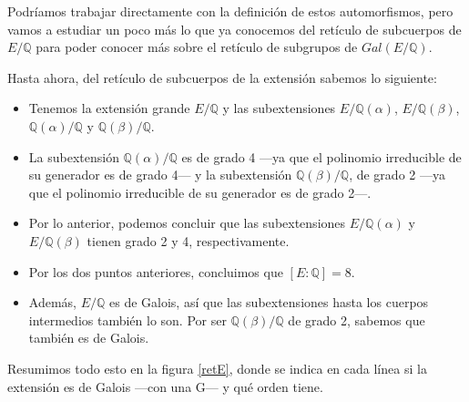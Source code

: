 \documentclass[a4paper, 11pt]{article}
\begin{document}
\begin{solucion}
      Podríamos trabajar directamente con la definición de estos automorfismos, pero vamos a estudiar un poco más lo que ya conocemos del retículo de subcuerpos de $E/\mathbb{Q}$ para poder conocer más sobre el retículo de subgrupos de $Gal(E/\mathbb{Q})$.

      Hasta ahora, del retículo de subcuerpos de la extensión sabemos lo siguiente:
      \begin{itemize}
          \item Tenemos la extensión grande $E/\mathbb{Q}$ y las subextensiones $E/\mathbb{Q}(\alpha)$, $E/\mathbb{Q}(\beta)$, $\mathbb{Q}(\alpha)/\mathbb{Q}$ y $\mathbb{Q}(\beta)/\mathbb{Q}$.
          \item La subextensión $\mathbb{Q}(\alpha)/\mathbb{Q}$ es de grado 4 ---ya que el polinomio irreducible de su generador es de grado 4--- y la subextensión $\mathbb{Q}(\beta)/\mathbb{Q}$, de grado 2 ---ya que el polinomio irreducible de su generador es de grado 2---.
          \item Por lo anterior, podemos concluir que las subextensiones $E/\mathbb{Q}(\alpha)$ y $E/\mathbb{Q}(\beta)$ tienen grado 2 y 4, respectivamente.
          \item Por los dos puntos anteriores, concluimos que $[E:\mathbb{Q}] = 8$.
          \item Además, $E/\mathbb{Q}$ es de Galois, así que las subextensiones hasta los cuerpos intermedios también lo son. Por ser $\mathbb{Q}(\beta)/\mathbb{Q}$ de grado 2, sabemos que también es de Galois.
      \end{itemize}

      Resumimos todo esto en la figura \ref{retE}, donde se indica en cada línea si la extensión es de Galois ---con una G--- y qué orden tiene.

      \begin{figure}[ht]
          \centering
\end{figure}
\end{solucion}
\end{document}
